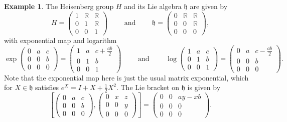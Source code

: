 \documentclass[11pt]{article}
\numberwithin{equation}{section}
\theoremstyle{plain}
\theoremstyle{definition}
\newtheorem{example}[thm]{Example}
\theoremstyle{remark}
\numberwithin{equation}{section}
\newcommand{\R}{\mathbb R}
\numberwithin{equation}{section}
\begin{document}
\begin{example}
\label{ex:heisenberg_def}
The Heisenberg group $H$ and its Lie algebra $\mathfrak{h}$ are given by
\[
H=\left(\begin{matrix} 1 & \R & \R \\ 0 & 1 & \R \\ 0&0&1\end{matrix}\right) \qquad \text{ and } \qquad
\mathfrak{h}=\left(\begin{matrix} 0 & \R & \R \\ 0 & 0 & \R \\ 0&0&0\end{matrix}\right),
\]
with exponential map and logarithm
\[
\exp \left(\begin{matrix} 0 & a & c \\ 0 & 0 & b \\ 0&0&0\end{matrix}\right) = \left(\begin{matrix} 1 & a & c+\frac{ab}{2} \\ 0 & 1 & b \\ 0&0&1\end{matrix}\right) \qquad \text{ and } \qquad \log \left(\begin{matrix} 1 & a & c \\ 0 & 1 & b \\ 0&0&1\end{matrix}\right) = \left(\begin{matrix} 0 & a & c-\frac{ab}{2} \\ 0 & 0 & b \\ 0&0&0\end{matrix}\right).
\]
Note that the exponential map here is just the usual matrix exponential, which for $X\in \mathfrak{h}$ satisfies $e^X=I+X+\frac{1}{2}X^2$. The Lie bracket on $\mathfrak{h}$ is given by
\[
\left[\left(\begin{matrix} 0 & a & c \\ 0 & 0 & b \\ 0&0&0\end{matrix}\right),\left(\begin{matrix} 0 & x & z \\ 0 & 0 & y \\ 0&0&0\end{matrix}\right)\right] = \left(\begin{matrix} 0 & 0 & ay-xb \\ 0 & 0 & 0 \\ 0&0&0\end{matrix}\right).
\]
\end{example}
\end{document}
